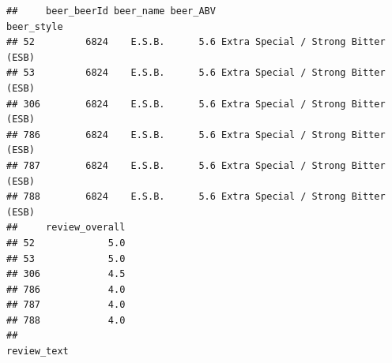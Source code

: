 \documentclass[
  a4paper,
]{article}
\begin{document}
\begin{verbatim}
##     beer_beerId beer_name beer_ABV                          beer_style
## 52         6824    E.S.B.      5.6 Extra Special / Strong Bitter (ESB)
## 53         6824    E.S.B.      5.6 Extra Special / Strong Bitter (ESB)
## 306        6824    E.S.B.      5.6 Extra Special / Strong Bitter (ESB)
## 786        6824    E.S.B.      5.6 Extra Special / Strong Bitter (ESB)
## 787        6824    E.S.B.      5.6 Extra Special / Strong Bitter (ESB)
## 788        6824    E.S.B.      5.6 Extra Special / Strong Bitter (ESB)
##     review_overall
## 52             5.0
## 53             5.0
## 306            4.5
## 786            4.0
## 787            4.0
## 788            4.0
##                                                                                                                                                                                                                                                                                                                                                                                                                                                                                                                                                                                                                                                                                                                                                                                                                                                                                                                                                                                                                                                                                                                                                                                                                                                                                                                                                                                                                                                                                                                                                                                                                                                                                                                                                                    review_text

\end{verbatim}
\end{document}

